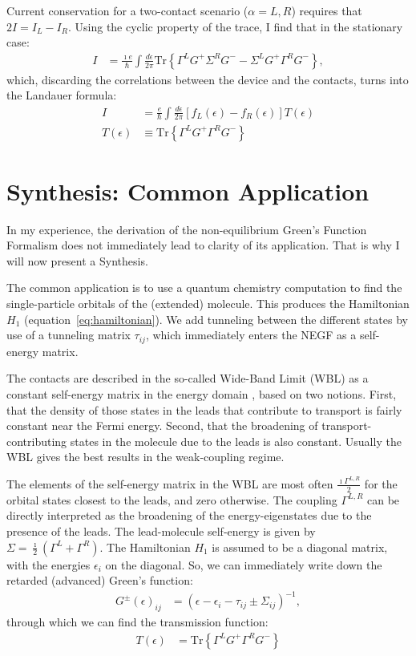 Current conservation for a two-contact scenario ($\alpha=L,R$) requires that $2 I = I_L - I_R$. Using the cyclic property of the trace, I find that in the stationary case:
\begin{align*}
I &= \frac{\imath e}{\hbar} \int \frac{d\epsilon}{2\pi} \text{Tr}\left\{ \Gamma^L G^+ \Sigma^R G^- - \Sigma^L G^+ \Gamma^R G^-\right\},
\end{align*}
which, discarding the correlations between the device and the contacts, turns into the Landauer formula:
\begin{align}
I &= \frac{e}{\hbar} \int \frac{d\epsilon}{2\pi} \left[ f_L(\epsilon) - f_R(\epsilon)\right] T(\epsilon) \label{eq:landauer}\\
T(\epsilon)&\equiv \text{Tr}\left\{ \Gamma^L G^+ \Gamma^R G^-\right\}\nonumber
\end{align}

\section{Synthesis: Common Application}
\label{sec:synthesis}


In my experience, the derivation of the non-equilibrium Green's Function Formalism does not immediately lead to clarity of its application. That is why I will now present a Synthesis.

The common application is to use a quantum chemistry computation to find the single-particle orbitals of the (extended) molecule. This produces the Hamiltonian $H_1$ (equation~\ref{eq:hamiltonian}). We add tunneling between the different states by use of a tunneling matrix $\tau_{ij}$, which immediately enters the NEGF as a self-energy matrix. 

The contacts are described in the so-called Wide-Band Limit (WBL) as a constant self-energy matrix in the energy domain \cite{wbl}, based on two notions. First, that the density of those states in the leads that contribute to transport  is fairly constant near the Fermi energy. Second, that the broadening of transport-contributing states in the molecule due to the leads is also constant. Usually the WBL gives the best results in the weak-coupling regime.

The elements of the self-energy matrix in the WBL are most often $\frac{\imath \Gamma^{L,R}}{2}$ for the orbital states closest to the leads, and zero otherwise. The coupling $\Gamma^{L,R}$ can be directly interpreted as the broadening of the energy-eigenstates due to the presence of the leads. The lead-molecule self-energy is given by $\Sigma = \frac{\imath}{2} \left( \Gamma^L + \Gamma^R \right)$. The Hamiltonian $H_1$ is assumed to be a diagonal matrix, with the energies $\epsilon_i$ on the diagonal. So, we can immediately write down the retarded (advanced) Green's function:
\begin{align}
G^\pm(\epsilon)_{ij} &= \left(\epsilon - \epsilon_i - \tau_{ij} \pm \Sigma_{ij}\right)^{-1}
\label{eq:commongf},
\end{align}
through which we can find the transmission function:
\begin{align}
T(\epsilon) &= \text{Tr}\left\{\Gamma^L G^+ \Gamma^R G^-\right\}
\label{eq:commonte}
\end{align}

